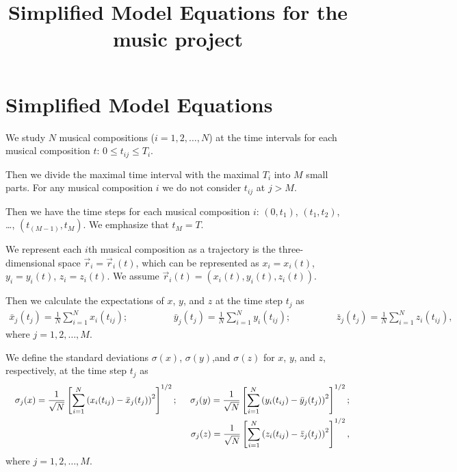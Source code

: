 \documentclass[preprintnumbers,amsmath,amssymb]{revtex4}
\begin{document}
\title{Simplified Model Equations for the music project}

\author{}








 \maketitle

\section{Simplified Model Equations}


We study $N$ musical compositions ($i = 1,2, \ldots, N$) at the time
intervals for each musical composition $t$: $0  \leq t_{ij} \leq
T_{i}$.

Then we divide the maximal time interval with the maximal $T_{i}$
into $M$ small parts. For any musical composition $i$ we do not
consider $t_{ij}$ at $j > M$.


Then we have the time steps for each musical composition $i$: $(0,
t_{1})$, $(t_{1}, t_{2})$, \ldots,  $(t_{(M-1)}, t_{M})$.  We
emphasize that $t_{M} = T$.

We represent each $i$th musical composition as a trajectory is the
three-dimensional space $\vec{r}_{i} = \vec{r}_{i}(t)$, which can be
represented as $x_{i} = x_{i}(t)$, $y_{i} = y_{i}(t)$, $z_{i} =
z_{i}(t)$. We assume $\vec{r}_{i}(t) = (x_{i}(t), y_{i}(t),
z_{i}(t))$.


Then we calculate the expectations of $x$, $y$, and $z$ at the time
step $t_{j}$ as
\begin{eqnarray}
\label{expect} \bar{x}_{j}(t_{j}) = \frac{1}{N} \sum_{i = 1}^{N}
x_{i}(t_{ij}); \hspace{2cm} \bar{y}_{j}(t_{j}) = \frac{1}{N} \sum_{i
= 1}^{N} y_{i}(t_{ij});
 \hspace{2cm} \bar{z}_{j}(t_{j}) = \frac{1}{N} \sum_{i
= 1}^{N} z_{i}(t_{ij}),
\end{eqnarray}
where $j = 1,2, \ldots, M$.

We define the standard deviations $\sigma (x)$, $\sigma (y)$,and
$\sigma (z)$ for $x$, $y$, and $z$, respectively,  at the time step
$t_{j}$ as
\begin{eqnarray}
\label{sigma} && \sigma_{j} (x) = \frac{1}{\sqrt{N}} \left[ \sum_{i
= 1}^{N} \left(x_{i}(t_{ij}) -  \bar{x}_{j}(t_{j})
\right)^{2}\right]^{1/2} ; \hspace{0.5cm}
 \sigma_{j} (y) = \frac{1}{\sqrt{N}} \left[ \sum_{i =
1}^{N} \left(y_{i}(t_{ij}) -  \bar{y}_{j}(t_{j})
\right)^{2}\right]^{1/2} ; \nonumber \\
&& \sigma_{j} (z) = \frac{1}{\sqrt{N}} \left[ \sum_{i = 1}^{N}
\left(z_{i}(t_{ij}) -  \bar{z}_{j}(t_{j}) \right)^{2}\right]^{1/2} ,
\end{eqnarray}
where $j = 1,2, \ldots, M$.
\end{document}
